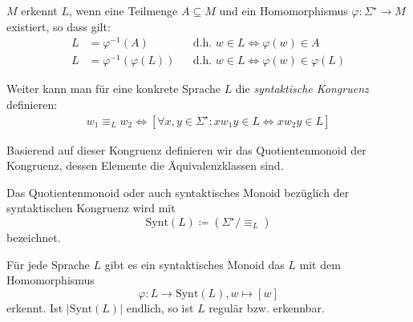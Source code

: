 $M$ erkennt $L$, wenn eine Teilmenge $A\subseteq M$ und ein Homomorphismus $\varphi:\Sigma^\star \rightarrow M$ existiert, so dass gilt:
\begin{align*}
	L&=\varphi^{-1}(A) &&\text{d.h. }w\in L \Leftrightarrow \varphi(w)\in A\\
	L&=\varphi^{-1}(\varphi(L)) &&\text{d.h. }w\in L \Leftrightarrow \varphi(w)\in \varphi(L)
\end{align*}

Weiter kann man für eine konkrete Sprache $L$ die \emph{syntaktische Kongruenz} definieren:
\begin{align*}
	w_1\equiv_Lw_2 \Longleftrightarrow [\forall x,y\in\Sigma^\star : xw_1y\in L \Leftrightarrow xw_2y\in L]
\end{align*}

Basierend auf dieser Kongruenz definieren wir das Quotientenmonoid der Kongruenz, dessen Elemente die Äquivalenzklassen sind.

Das Quotientenmonoid oder auch syntaktisches Monoid bezüglich der syntaktischen Kongruenz wird mit
\begin{equation*}
	\mathrm{Synt}(L)\coloneqq\left(\Sigma^\star/\equiv_L\right)
\end{equation*}
bezeichnet.

Für jede Sprache $L$ gibt es ein syntaktisches Monoid das $L$ mit dem Homomorphismus
\begin{equation*}
	\varphi: L\rightarrow \mathrm{Synt}(L), w\mapsto [w]
\end{equation*}
erkennt.
Ist $|\mathrm{Synt}(L)|$ endlich, so ist $L$ regulär bzw. erkennbar.



